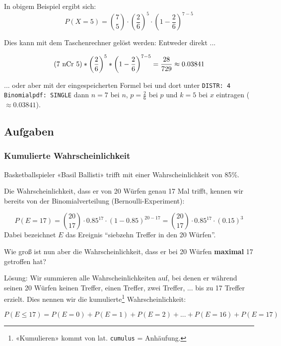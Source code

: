 In obigem Beispiel ergibt sich:
$$P(X=5) =
{{7}\choose {5}}
\cdot{}\left(\frac26\right)^5\cdot{}\left(1-\frac26\right)^{7-5}$$

Dies kann mit dem Taschenrechner gelöst werden:
Entweder direkt ...

$$( 7 \textrm{\,\,nCr\,\,} 5 ) *\left(\frac26\right)^5 *
\left(1-\frac26\right)^{7-5} = \frac{28}{729} \approx 0.03841$$

... oder aber mit der eingespeicherten Formel bei
 und dort unter \texttt{DISTR: 4
  Binomialpdf: SINGLE} dann $n=7$ bei $n$, $p=\frac26$ bei $p$ und
$k=5$ bei $x$ eintragen ($\approx 0.03841$).
\newpage

\subsection*{Aufgaben}



\newpage
\subsubsection{Kumulierte Wahrscheinlichkeit}

Basketballspieler «Basil Ballisti» trifft mit einer
Wahrscheinlichkeit von 85\%.

Die Wahrscheinlichkeit, dass er von 20 Würfen genau 17 Mal trifft, kennen wir
bereits von der Binomialverteilung (Bernoulli-Experiment):

$$P(E=17) = {20 \choose 17}\cdot 0.85^{17}\cdot (1-0.85)^{20-17} =  {20 \choose 17}\cdot 0.85^{17}\cdot (0.15)^{3}$$
Dabei bezeichnet $E$ das Ereignis ``siebzehn Treffer in den 20 Würfen''.

Wie groß ist nun aber die Wahrscheinlichkeit, dass er bei 20 Würfen
\textbf{maximal} 17 getroffen hat?

Lösung: Wir summieren alle Wahrscheinlichkeiten auf, bei denen er
während seinen 20 Würfen
keinen Treffer, einen Treffer, zwei Treffer, ... bis zu 17 Treffer
erzielt. Dies nennen wir die kumulierte\footnote{«Kumulieren» kommt von
  lat. \texttt{cumulus} = Anhäufung.} Wahrscheinlichkeit:

$$P(E\le 17) = P(E=0) + P(E=1) + P(E=2) + ... + P(E=16) + P(E=17)$$


